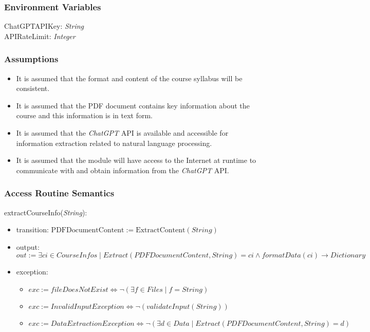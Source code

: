 \documentclass[12pt, titlepage]{article}
\begin{document}
\begin{itemize}
\subsubsection{Environment Variables}
ChatGPTAPIKey: \textit{String}\\
APIRateLimit: \textit{Integer}

\subsubsection{Assumptions}

\begin{itemize}
  \item It is assumed that the format and content of the course syllabus will be consistent. 
  \item It is assumed that the PDF document contains key information about the course and this information is in text form.
  \item It is assumed that the \textit{ChatGPT} API is available and accessible for information extraction related to natural language processing.
  \item It is assumed that the module will have access to the Internet at runtime to communicate with and obtain information from the \textit{ChatGPT} API.
\end{itemize}

\subsubsection{Access Routine Semantics}

\noindent extractCourseInfo(\textit{String}):
\begin{itemize}
\item transition: \( \text{PDFDocumentContent} := \text{ExtractContent}(String) \)
\item output: $out := \mathit{\exists ci \in CourseInfos \mid Extract(PDFDocumentContent, String) = ci \land formatData(ci) \rightarrow Dictionary}$
\item exception: 
    \begin{itemize}
        \item $exc := \mathit{fileDoesNotExist} \iff \lnot (\exists f \in Files \mid f = String)$
        \item $exc := \mathit{InvalidInputException} \iff \lnot (validateInput(String))$
        \item $exc := \mathit{DataExtractionException} \iff \lnot (\exists d \in Data \mid Extract(PDFDocumentContent, String) = d)$
    \end{itemize}
\end{itemize}


\end{itemize}
\end{document}
